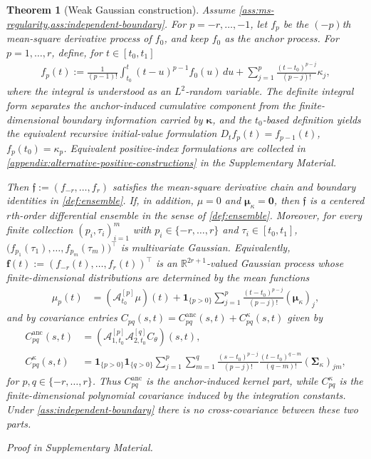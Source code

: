 \documentclass[11pt,a4paper]{article}
\newtheorem{theorem}{Theorem}
\theoremstyle{definition}
\theoremstyle{remark}
\newenvironment{maintheorem}[1][]{\begin{theorem}[#1]}{\par\noindent\emph{Proof in Supplementary Material.}\end{theorem}}
\begin{document}
\begin{maintheorem}[Weak Gaussian construction]\label{prop:gaussian-ensemble}
Assume \cref{ass:ms-regularity,ass:independent-boundary}. For $p=-r,\ldots,-1$, let $f_p$ be the $(-p)$th mean-square derivative process of $f_0$, and keep $f_0$ as the anchor process. For $p=1,\ldots,r$, define, for $t\in[t_0,t_1]$
\begin{align*}
  f_p(t)
:=
\frac{1}{(p-1)!}\int_{t_0}^t (t-u)^{p-1}f_0(u)\,du
+
\sum_{j=1}^{p}\frac{(t-t_0)^{p-j}}{(p-j)!}\kappa_j,
\end{align*}
where the integral is understood as an $L^2$-random variable.
The definite integral form separates the anchor-induced cumulative component from the finite-dimensional boundary information carried by \(\boldsymbol{\kappa}\), and the \(t_0\)-based definition yields the equivalent recursive initial-value formulation \(D_t f_p(t)=f_{p-1}(t)\), \(f_p(t_0)=\kappa_p\). Equivalent positive-index formulations are collected in \cref{appendix:alternative-positive-constructions} in the Supplementary Material.

Then \(\mathfrak f := (f_{-r},\ldots,f_r)\) satisfies the mean-square derivative chain and boundary identities in \cref{def:ensemble}. If, in addition, \(\mu = 0\) and \(\boldsymbol\mu_\kappa=\mathbf 0\), then \(\mathfrak f\) is a centered \(r\)th-order differential ensemble in the sense of \cref{def:ensemble}. Moreover, for every finite collection \((p_i,\tau_i)_{i=1}^m\) with \(p_i\in\{-r,\ldots,r\}\) and \(\tau_i\in[t_0,t_1]\), $\bigl(f_{p_1}(\tau_1),\ldots,f_{p_m}(\tau_m)\bigr)^\top$
is multivariate Gaussian. Equivalently, \(\mathbf f(t):=(f_{-r}(t), \ldots, f_r(t))^\top\) is an \(\mathbb{R}^{2r+1}\)-valued Gaussian process whose finite-dimensional distributions are determined by the mean functions
\begin{align*}
\mu_p(t)
&= (\mathcal A_{t_0}^{[p]}\mu)(t)
+ \mathbf{1}_{\{p>0\}}
\sum_{j=1}^{p}\frac{(t-t_0)^{p-j}}{(p-j)!}(\boldsymbol{\mu}_\kappa)_j,
\end{align*}
and by covariance entries $C_{pq}(s,t) = C^{\mathrm{anc}}_{pq}(s,t)+C^{\kappa}_{pq}(s,t)$ given by
\begin{align*}
C^{\mathrm{anc}}_{pq}(s,t)
&= (\mathcal A_{1,t_0}^{[p]}\mathcal A_{2,t_0}^{[q]}C_\theta)(s,t),\\
C^{\kappa}_{pq}(s,t)
&= \mathbf{1}_{\{p>0\}}\mathbf{1}_{\{q>0\}}
\sum_{j=1}^{p}\sum_{m=1}^{q}
\frac{(s-t_0)^{p-j}}{(p-j)!}
\frac{(t-t_0)^{q-m}}{(q-m)!}
(\boldsymbol{\Sigma}_\kappa)_{jm},
\end{align*}
for \(p,q\in\{-r,\ldots,r\}\). Thus \(C^{\mathrm{anc}}_{pq}\) is the anchor-induced kernel part, while \(C^{\kappa}_{pq}\) is the finite-dimensional polynomial covariance induced by the integration constants. Under \cref{ass:independent-boundary} there is no cross-covariance between these two parts.
\end{maintheorem}
\end{document}
